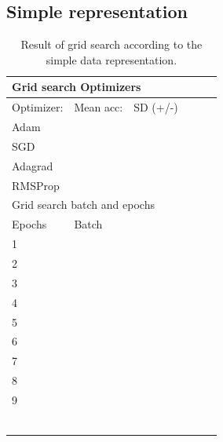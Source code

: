 \subsection{Simple representation}
\begin{table}[H]
\centering

\begin{longtable}{|l|l|l|l|l|l|}
\hline
\multicolumn{6}{|l|}{Grid search Optimizers}     \\ \hline
Optimizer: & Mean acc: & SD (+/-)   &      &     &     \\ \hline
Adam       &           &      &      &     &     \\ \hline
SGD        &           &      &      &     &     \\ \hline
Adagrad    &           &      &      &     &     \\ \hline
RMSProp    &           &      &      &     &     \\ \hline

\multicolumn{6}{l}{Grid search batch and epochs} \\ \hline
Epochs     & Batch     &      &      &     &     \\ \hline
1          &           &      &      &     &     \\ \hline 
2          &           &      &      &     &     \\
3          &           &      &      &     &     \\
4          &           &      &      &     &     \\
5          &           &      &      &     &     \\
6          &           &      &      &     &     \\
7          &           &      &      &     &     \\
8          &           &      &      &     &     \\
9          &           &      &      &     &     \\
\multicolumn{6}{l}{}                             \\
           &           &      &      &     &     \\
           &           &      &      &     &     \\
           &           &      &      &     &     \\
           &           &      &      &     &     \\
           &           &      &      &     &     
           
\end{longtable}
\caption{Result of grid search according to the simple data representation.}
\label{tab:gridResults}
\end{table}



